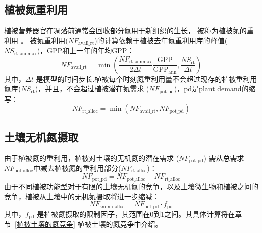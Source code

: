 \subsection{植被氮重利用}\label{植被氮重利用}
植被营养器官在凋落前通常会回收部分氮用于新组织的生长，
被称为植被氮的重利用 \citep{magill1997biogeochemical,oikawa2005dynamics,son1991aboveground}。
被氮重利用($NF_{\mathrm{avail\_rt}}$)的计算依赖于植被去年氮重利用库的峰值($NS_{\mathrm{rt\_{annmax}}}$)，GPP和上一年的年均GPP：
\begin{equation}
  NF_{\mathrm{avail\_rt}}=\min{\left(\frac{NF_{\mathrm{rt\_{annmax}}}}{2\Delta t} \frac{\text{GPP}}{\text{GPP}_{\mathrm{ann}}}, \frac{NS_{\mathrm{rt}}}{{\Delta t}}\right)}
\end{equation}
其中，${\Delta t}$ 是模型的时间步长.植被每个时刻氮重利用量不会超过现存的植被重利用氮库($NS_{\mathrm{rt}}$)，并且，不会超过植被潜在氮需求 ($NF_{\mathrm{pot\_{pd}}}$)，pd是plant demand的缩写：
\begin{equation}\label{NF_rt_alloc}
  NF_{\mathrm{rt\_alloc}}=\min{\left(NF_{\mathrm{avail\_{rt}}}, NF_{\mathrm{pot\_{pd}}}\right)}
\end{equation}


\subsection{土壤无机氮摄取}\label{土壤无机氮摄取}
由于植被氮的重利用，植被对土壤的无机氮的潜在需求 ($NF_{\mathrm{pot\_{pd}}}$) 需从总需求$NF_{\mathrm{pot\_{alloc}}}$中减去植被氮的重利用部分($NF_{\mathrm{rt\_{alloc}}}$)：
\begin{equation}\label{NF_plant_demand_soil}
  NF_{\mathrm{pot\_{pd}}} = NF_{\mathrm{pot\_{alloc}}} - NF_{\mathrm{rt\_alloc}}
\end{equation}
由于不同植被功能型对于有限的土壤无机氮的竞争，以及土壤微生物和植被之间的竞争，植被从土壤中的无机氮摄取将进一步缩减：
\begin{equation}\label{NF_sminn_alloc}
  NF_{\mathrm{sminn\_alloc}} = NF_{\mathrm{pot\_{pd}}}\cdot f_{\mathrm{pd}}
\end{equation}
其中，$f_{\mathrm{pd}}$ 是植被氮摄取的限制因子，其范围在0到1之间。其具体计算将在章节~\ref{植被土壤的氮竞争} 植被土壤的氮竞争中介绍。


